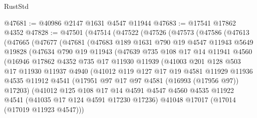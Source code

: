 \begin{lexlean}{RustStd}
\begin{coremodule}
@47681 := @40986 @2147 @1631 @4547 @11944
@47683 := @17541 @17862 @4352
@47828 := @47501
    (@47514
      (@47522
        (@47526
          (@47573
            (@47586
              (@47613
                (@47665
                  (@47677
                    (@47681
                      (@47683
                        @189
                        @1631
                        @790
                        @19
                        @4547
                        @11943
                        @5649
                        @19828
                        (@47634
                          @790
                          @19
                          @11943
                          (@47639
                            @735
                            @108
                            @17
                            @14
                            @11941
                            @4560
                            (@16946
                              @17862
                              @4352
                              @735
                              @17
                              @11930
                              @11939
                              (@41003
                                @201
                                @128
                                @503
                                @17
                                @11930
                                @11937
                                @4940
                                (@41012
                                  @119
                                  @127
                                  @17
                                  @19
                                  @4581
                                  @11929
                                  @11936
                                  @4535
                                  @11912
                                  @4541
                                  (@17951 @97 @17 @97 @4581 (@16993 (@17956 @97)) @17203)
                                  (@41012
                                    @125
                                    @108
                                    @17
                                    @14
                                    @4591
                                    @4547
                                    @4560
                                    @4535
                                    @11922
                                    @4541
                                    (@41035 @17 @124 @4591 @17230 @17236)
                                    @41048
                                    @17017
                                    (@17014 (@17019 @11923 @4547)))

\end{coremodule}
\end{lexlean}

